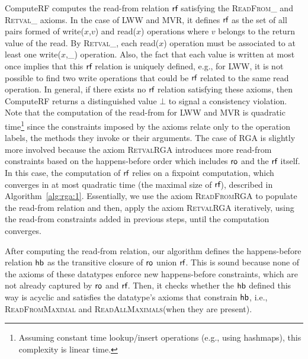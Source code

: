 \begin{algorithm}[t]
  {\footnotesize}
  \caption{The procedure {\sf ComputeRF} for RGA.}
  \label{alg:rga:1}
\end{algorithm}


{\sf ComputeRF} computes the read-from relation $\textsf{rf}$ satisfying the \textsc{ReadFrom\_} and \textsc{Retval\_} axioms. In the case of LWW and MVR, it defines $\textsf{rf}$ as the set of all pairs formed of {\sf write}($x$,$v$) and {\sf read}($x$) operations where $v$ belongs to the return value of the {\sf read}. By \textsc{Retval\_}, each {\sf read}($x$) operation must be associated to at least one {\sf write}($x$,\_) operation. Also, the fact that each value is written at most once implies that this $\textsf{rf}$ relation is uniquely defined, e.g., for LWW, it is not possible to find two {\sf write} operations that could be $\textsf{rf}$ related to the same {\sf read} operation. In general, if there exists no $\textsf{rf}$ relation satisfying these axioms, then {\sf ComputeRF} returns a distinguished value $\bot$ to signal a consistency violation. Note that the computation of the read-from for LWW and MVR is quadratic time\footnote{Assuming constant time lookup/insert operations (e.g., using hashmaps), this complexity is linear time.} since the constraints imposed by the axioms relate only to the operation labels, the methods they invoke or their arguments. The case of RGA is slightly more involved because the axiom \textsc{RetvalRGA} introduces more read-from constraints based on the happens-before order which includes $\mathsf{ro}$ and the $\textsf{rf}$ itself. In this case, the computation of $\textsf{rf}$ relies on a fixpoint computation, which converges in at most quadratic time (the maximal size of $\textsf{rf}$), described in Algorithm~\ref{alg:rga:1}. Essentially, we use the axiom \textsc{ReadFromRGA} to populate the read-from relation and then, apply the axiom \textsc{RetvalRGA} iteratively, using the read-from constraints added in previous steps, until the computation converges.

After computing the read-from relation, our algorithm defines the happens-before relation $\textsf{hb}$ as the transitive closure of $\mathsf{ro}$ union $\textsf{rf}$. This is sound because none of the axioms of these datatypes enforce new happens-before constraints, which are not already captured by $\mathsf{ro}$ and $\textsf{rf}$. Then, it checks whether the $\textsf{hb}$ defined this way is acyclic and satisfies the datatype's axioms that constrain $\textsf{hb}$, i.e., \textsc{ReadFromMaximal} and \textsc{ReadAllMaximals}(when they are present).

